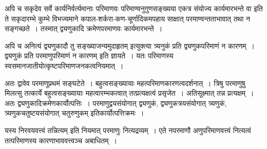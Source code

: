 {अपि च सकृदेव सर्वे कार्यनिर्वर्त्यमानाः परिमाणवः परिमाण्वनुगुणसङ्ख्यया एकत्र संयोज्य कार्यमारभन्ते वा इति ते सकृदारम्भे कुम्भे विभज्यमाने कपाल-शर्करा-कण-चूर्णादिकमपहाय साक्षात् परमाण्वन्तताभावात् तथा न सङ्गच्छते~। तस्मात् द्व्यणुकादि क्रमेणपरमाणवः कार्यमारभन्ते~। 

अपि च अनित्यं द्व्यणुकादौ तु सङ्ख्याजन्यमुदाहृतम् इत्युक्त्या त्र्यनुकं प्रति द्व्यणुकपरिमाणं न कारणम्~। द्व्यणुकं प्रति परमाणुपरिमाणं न कारणम् इति ज्ञायते~। यतः परिमाणस्य स्वसमानजातीयोत्कृष्टपरिमाणजनकत्वनियमात्~। 

अतः द्वावेव परमाणूप्रथमं सङ्घटेते~। बहुत्वसङ्ख्यायाः महत्परिमाणकारणत्वदर्शनात्~। त्रिषु परमाणुषु मिलत्सु तत्कार्ये बहुत्वसङ्ख्यायाः महत्वारम्भकत्वात् तत्प्रत्यक्षत्वं प्रसृजेत~। अतिसूक्ष्मात् तन्न प्रत्यक्षम्~। अतः द्व्यणुकादिक्रमेणकार्योत्पत्तिः~। परमाणुद्वयसंयोगात् द्व्यणुकं, द्व्यणुकत्रयसंयोगात् त्र्यणुकं, त्र्यणुकचतुष्टयसंयोगात् चतुरुणुकम् इति\break कार्योत्पत्तिक्रमः~। 

यस्य निरवयवत्त्वं तन्नित्यम् इति नियमात् परमाणुः नित्यद्रव्यम्~। एते नपरमाणौ अणुपरिमाणवत्त्वं नित्यत्वं तत्परिमाणस्य कारणाभाववत्त्वञ्च अबाधितम्~। 

\articleend
}
